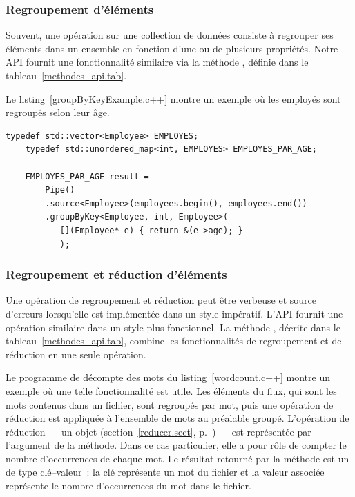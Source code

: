 \subsubsection{Regroupement d'\'el\'ements}

Souvent, une op\'eration sur une collection de donn\'ees consiste \`a regrouper ses \'el\'ements dans un ensemble en fonction d'une ou de plusieurs propri\'et\'es. Notre {API} fournit une fonctionnalit\'e similaire via la m\'ethode , d\'efinie dans le tableau~\ref{methodes_api.tab}. 

Le listing~\ref{groupByKeyExample.c++} montre un exemple o\`u les employ\'es sont regroup\'es selon leur \^age.

\begin{Listing}[tbp]
\begin{lstlisting}[gobble=4]
    typedef std::vector<Employee> EMPLOYES;
    typedef std::unordered_map<int, EMPLOYES> EMPLOYES_PAR_AGE;

    EMPLOYES_PAR_AGE result = 
        Pipe()
        .source<Employee>(employees.begin(), employees.end())
        .groupByKey<Employee, int, Employee>( 
           [](Employee* e) { return &(e->age); } 
           );

\end{lstlisting}
\caption{Un pipeline pour regrouper les employ\'es selon leur \^age.}
\label{groupByKeyExample.c++}
\end{Listing}


\subsubsection{Regroupement et r\'eduction d'\'el\'ements}

Une op\'eration de regroupement et r\'eduction peut \^etre verbeuse et source d'erreurs lorsqu'elle est impl\'ement\'ee dans un style imp\'eratif. L'{API} fournit une op\'eration similaire dans un style plus fonctionnel. La m\'ethode , d\'ecrite dans le tableau~\ref{methodes_api.tab}, combine les fonctionnalit\'es de regroupement et de r\'eduction en une seule op\'eration. 

Le programme de d\'ecompte des mots du listing~\ref{wordcount.c++} montre un exemple o\`u une telle fonctionnalit\'e est utile. Les \'el\'ements du flux, qui sont les mots contenus dans un fichier, sont regroup\'es par mot, puis une op\'eration de r\'eduction est appliqu\'ee \`a l'ensemble de mots au pr\'ealable group\'e. L'op\'eration de r\'eduction --- un objet  (section~\ref{reducer.sect}, p.~\pageref{reducer.sect})  --- est repr\'esent\'ee par l'argument de la m\'ethode. Dans ce cas particulier, elle a pour r\^ole de compter le nombre d'occurrences de chaque mot. Le r\'esultat retourn\'e par la m\'ethode  est un  de type cl\'e--valeur~: la cl\'e repr\'esente un mot du fichier et la valeur associ\'ee repr\'esente le nombre d'occurrences du mot dans le fichier.
